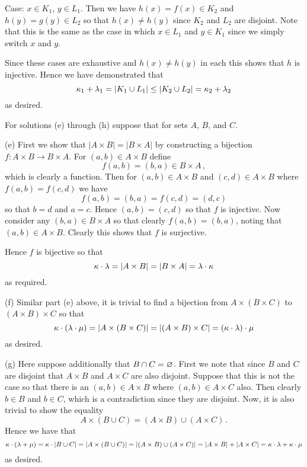 \begin{solution}
    Case: $x \in K_1$, $y \in L_1$.
    Then we have $h(x) = f(x) \in K_2$ and $h(y) = g(y) \in L_2$ so that $h(x) \neq h(y)$ since $K_2$ and $L_2$ are disjoint.
    Note that this is the same as the case in which $x \in L_1$ and $y \in K_1$ since we simply switch $x$ and $y$.

    Since these cases are exhaustive and $h(x) \neq h(y)$ in each this shows that $h$ is injective.
    Hence we have demonstrated that
    $$
    \kappa_1 + \lambda_1 = |K_1 \cup L_1| \leq |K_2 \cup L_2| = \kappa_2 + \lambda_2
    $$
    as desired. \qedsymbol

    For solutions (e) through (h) suppose that
    for sets $A$, $B$, and $C$.

    (e) First we show that $|A \times B| = |B \times A|$ by constructing a bijection $f : A \times B \to B \times A$.
    For $(a,b) \in A \times B$ define
    $$
    f(a,b) = (b,a) \in B \times A \,,
    $$
    which is clearly a function.
    Then for $(a,b) \in A \times B$ and $(c,d) \in A \times B$ where $f(a,b) = f(c,d)$ we have
    $$
    f(a,b) = (b,a) = f(c,d) = (d,c)
    $$
    so that $b=d$ and $a=c$.
    Hence $(a,b) = (c,d)$ so that $f$ is injective.
    Now consider any $(b,a) \in B \times A$ so that clearly $f(a,b) = (b,a)$, noting that $(a,b) \in A \times B$.
    Clearly this shows that $f$ is surjective.

    Hence $f$ is bijective so that
    $$
    \kappa \cdot \lambda = |A \times B| = |B \times A| = \lambda \cdot \kappa
    $$
    as required. \qedsymbol

    (f) Similar part (e) above, it is trivial to find a bijection from $A \times (B \times C)$ to $(A \times B) \times C$ so that
    $$
    \kappa \cdot (\lambda \cdot \mu) = |A \times (B \times C)| = |(A \times B) \times C| = (\kappa \cdot \lambda) \cdot \mu
    $$
    as desired. \qedsymbol

    (g) Here suppose additionally that $B \cap C = \varnothing$.
    First we note that since $B$ and $C$ are disjoint that $A \times B$ and $A \times C$ are also disjoint.
    Suppose that this is not the case so that there is an $(a,b) \in A \times B$ where $(a,b) \in A \times C$ also.
    Then clearly $b \in B$ and $b \in C$, which is a contradiction since they are disjoint.
    Now, it is also trivial to show the equality
    $$
    A \times (B \cup C) = (A \times B) \cup (A \times C) \,.
    $$
    Hence we have that
    $$
    \kappa \cdot (\lambda + \mu) = \kappa \cdot |B \cup C| = |A \times (B \cup C)| = |(A \times B) \cup (A \times C)|
    = |A \times B| + |A \times C| = \kappa \cdot \lambda + \kappa \cdot \mu
    $$
    as desired. \qedsymbol


\end{solution}
